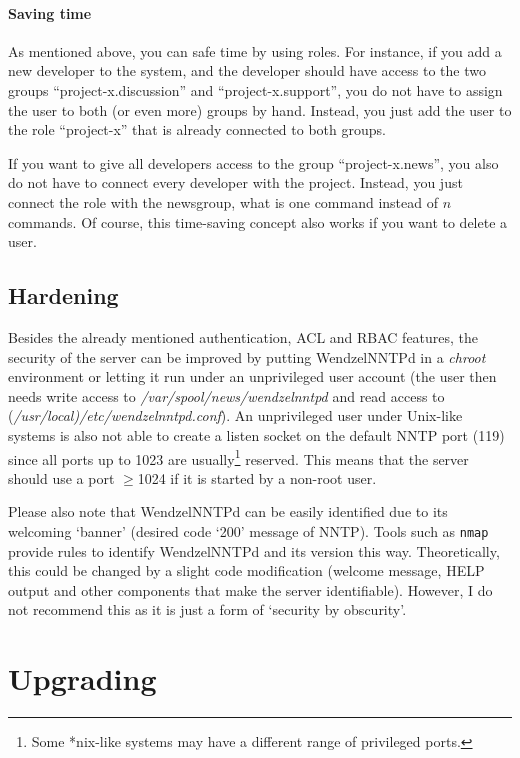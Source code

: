 \documentclass[12pt,fleqn,leqno]{scrbook}
\begin{document}
\hypertarget{saving-time-1}{%
\paragraph{Saving time}\label{saving-time-1}}

As mentioned above, you can safe time by using roles. For instance, if
you add a new developer to the system, and the developer should have
access to the two groups ``project-x.discussion'' and
``project-x.support'', you do not have to assign the user to both (or
even more) groups by hand. Instead, you just add the user to the role
``project-x'' that is already connected to both groups.

If you want to give all developers access to the group
``project-x.news'', you also do not have to connect every developer with
the project. Instead, you just connect the role with the newsgroup, what
is one command instead of \(n\) commands. Of course, this time-saving
concept also works if you want to delete a user.

\hypertarget{hardening-1}{%
\subsection{Hardening}\label{hardening-1}}

Besides the already mentioned authentication, ACL and RBAC features, the
security of the server can be improved by putting WendzelNNTPd in a
\emph{chroot} environment or letting it run under an unprivileged user
account (the user then needs write access to
\emph{/var/spool/news/wendzelnntpd} and read access to
(\emph{/usr/local)/etc/wendzelnntpd.conf}). An unprivileged user under
Unix-like systems is also not able to create a listen socket on the
default NNTP port (119) since all ports up to 1023 are
usually\footnote{Some *nix-like systems may have a different range of
  privileged ports.} reserved. This means that the server should use a
port \(\geq\)1024 if it is started by a non-root user.

Please also note that WendzelNNTPd can be easily identified due to its
welcoming `banner' (desired code `200' message of NNTP). Tools such as
\texttt{nmap} provide rules to identify WendzelNNTPd and its version
this way. Theoretically, this could be changed by a slight code
modification (welcome message, HELP output and other components that
make the server identifiable). However, I do not recommend this as it is
just a form of `security by obscurity'.

\hypertarget{upgrading-1}{%
\section{Upgrading}\label{upgrading-1}}
\end{document}
